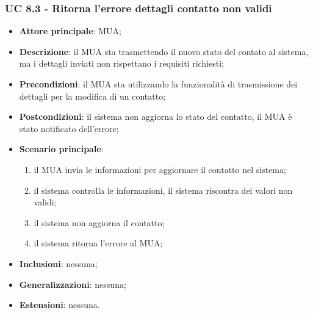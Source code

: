 \subsubsection{UC 8.3 - Ritorna l'errore dettagli contatto non validi} \label{sec:UC8.3}
    \begin{itemize}
        \item \textbf{Attore principale}: MUA;
        \item \textbf{Descrizione}: il MUA sta trasmettendo il nuovo stato del contato al sistema, ma i dettagli inviati non rispettano i requisiti richiesti;
        \item \textbf{Precondizioni}: il MUA sta utilizzando la funzionalità di trasmissione dei dettagli per la modifica di un contatto;
        \item \textbf{Postcondizioni}: il sistema non aggiorna lo stato del contatto, il MUA è stato notificato dell'errore;
        \item \textbf{Scenario principale}:
            \begin{enumerate}
                \item il MUA invia le informazioni per aggiornare il contatto nel sistema;
                \item il sistema controlla le informazioni, il sistema riscontra dei valori non validi;
                \item il sistema non aggiorna il contatto;
                \item il sistema ritorna l'errore al MUA;
            \end{enumerate}
        \item \textbf{Inclusioni}: nessuna;
        \item \textbf{Generalizzazioni}: nessuna;
        \item \textbf{Estensioni}: nessuna.
    \end{itemize}